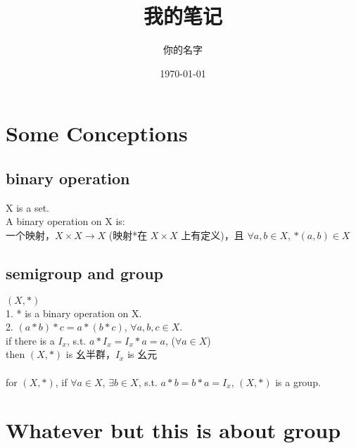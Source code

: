 \documentclass[12pt, a4paper]{article}  %
\title{我的笔记}
\author{你的名字}
\date{\today}
\begin{document}
\maketitle  %

\tableofcontents  %
\newpage  %

\section{Some Conceptions}

\subsection{binary operation}
X is a set.\\
A binary operation on X is:\\
一个映射，\(X \times X \rightarrow X\) (映射*在 \(X \times X\) 上有定义)，且 \(\forall a, b \in X\), \( *(a, b) \in X \)

\subsection{semigroup and group}
\((X,*)\)\\
1. * is a binary operation on X.\\
2. \((a * b) * c = a * (b * c)\), \(\forall a, b, c \in X\).\\
if there is a \(I_x\), s.t. \(a * I_x = I_x * a = a\), (\(\forall a \in X\))\\
then \((X,*)\) is 幺半群，\(I_x\) is 幺元\\
\\
for \((X,*)\), if \(\forall a \in X\), \(\exists b \in X\), s.t. \(a * b = b * a = I_x\), \((X,*)\) is a group.

\section{Whatever but this is about group}
\end{document}
